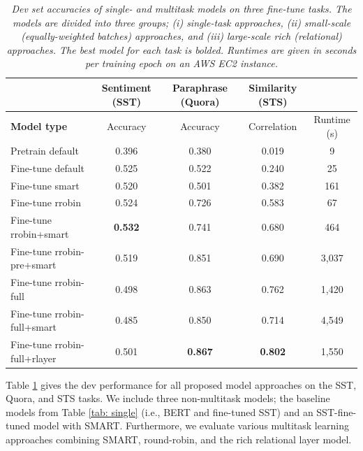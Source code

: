 \documentclass{article}
\begin{document}
\vspace{-0.2cm}
\begin{table}[h]
\footnotesize
\centering
\caption{\textit{Dev set accuracies of single- and multitask models on three fine-tune tasks. The models are divided into three groups; (i) single-task approaches, (ii) small-scale (equally-weighted batches) approaches, and (iii) large-scale rich (relational) approaches. The best model for each task is bolded. Runtimes are given in seconds per training epoch on an AWS EC2 instance.}}
\begin{tabular}{|l|cccc|} \hline
& \multicolumn{1}{c}{\textbf{Sentiment (SST)}} & \multicolumn{1}{c}{\textbf{Paraphrase (Quora)}} & \multicolumn{1}{c}{\textbf{Similarity (STS)}} &  \\ \hline
\textbf{Model type} & Accuracy & Accuracy & Correlation & Runtime (s) \\ \hline
Pretrain default      & 0.396         & 0.380            & 0.019 & 9          \\
Fine-tune default      & 0.525        & 0.522           & 0.240 &  25         \\ 
Fine-tune smart        & 0.520             & 0.501           & 0.382 & 161          \\ \hdashline
Fine-tune rrobin       & 0.524            & 0.726            & 0.583   & 67        \\
Fine-tune rrobin+smart & \textbf{0.532}              & 0.741            & 0.680 & 464          \\ \hdashline
Fine-tune rrobin-pre+smart & 0.519          & 0.851           & 0.690 & 3,037         \\
Fine-tune rrobin-full & 0.498          & 0.863           & 0.762 & 1,420         \\ 
Fine-tune rrobin-full+smart & 0.485          & 0.850           & 0.714 & 4,549         \\
Fine-tune rrobin-full+rlayer & 0.501     & \textbf{0.867}         & \textbf{0.802}    & 1,550                 \\ \hline
\end{tabular}
\label{tab: multi}
\end{table}

Table \ref{tab: multi} gives the dev performance for all proposed model approaches on the SST, Quora, and STS tasks. We include three non-multitask models; the baseline models from Table \ref{tab: single} (i.e., BERT and fine-tuned SST) and an SST-fine-tuned model with SMART. Furthermore, we evaluate various multitask learning approaches combining SMART, round-robin, and the rich relational layer model.  
\end{document}
